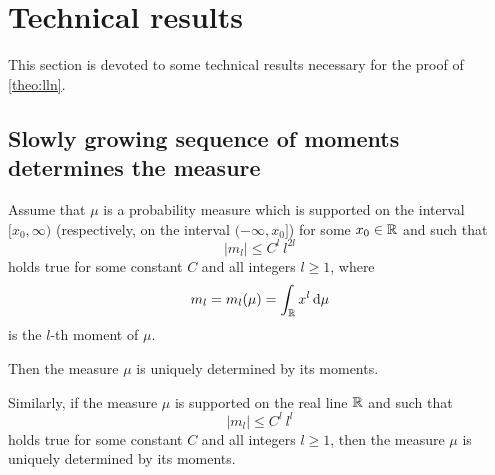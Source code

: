 \documentclass[12pt,usenames,dvipsnames,svgnames,table]{amsart}
\begin{document}
\section{Technical results}
\label{sec:moments-determine-measure}

This section is devoted to some technical results necessary for the 
proof of \cref{theo:lln}.

\subsection{Slowly growing sequence of moments determines the measure}

\begin{lemma}
	\label{lem:Carleman}
	Assume that $\mu$ is a probability measure which is supported on the interval $[x_0,\infty)$
	(respectively, on the interval $(-\infty,x_0]$) for some $x_0\in\mathbb{R}$ and such
	that
	\begin{equation}
	\label{eq:moments-slow}
	| m_{l} | \leq C^l\ l^{2l}    
	\end{equation}
	holds true for some constant $C$ and all integers $l\geq 1$, where
	\[ m_l = m_l(\mu) = \int_\R x^l \dif\mu \]
	is the $l$-th moment of $\mu$.
	
	Then the measure $\mu$ is uniquely determined by its moments.
	
	\medskip
	
	Similarly, if the measure $\mu$ is supported on the real line $\mathbb{R}$ and such that
	\begin{equation}
	\label{eq:moments-slow'}
	| m_{l} | \leq C^l\ l^{l}    
	\end{equation}
	holds true for some constant $C$ and all integers $l\geq 1$, then the measure $\mu$ is uniquely determined by its moments.
\end{lemma}
\end{document}
